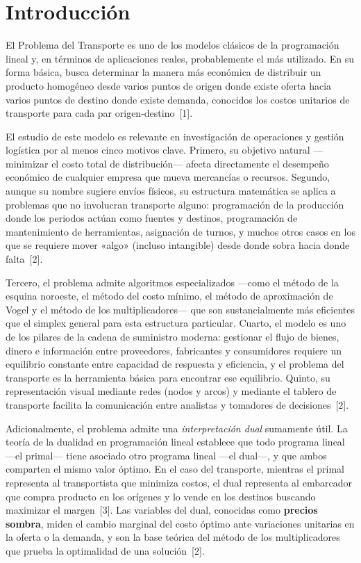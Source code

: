 \documentclass[10pt,letterpaper,twocolumn]{article}
\begin{document}
\section{Introducción}

El Problema del Transporte es uno de los modelos clásicos de la programación lineal y, en términos de aplicaciones reales, probablemente el más utilizado. En su forma básica, busca determinar la manera más económica de distribuir un producto homogéneo desde varios puntos de origen donde existe oferta hacia varios puntos de destino donde existe demanda, conocidos los costos unitarios de transporte para cada par origen-destino~[1].

El estudio de este modelo es relevante en investigación de operaciones y gestión logística por al menos cinco motivos clave. Primero, su objetivo natural ---minimizar el costo total de distribución--- afecta directamente el desempeño económico de cualquier empresa que mueva mercancías o recursos. Segundo, aunque su nombre sugiere envíos físicos, su estructura matemática se aplica a problemas que no involucran transporte alguno: programación de la producción donde los periodos actúan como fuentes y destinos, programación de mantenimiento de herramientas, asignación de turnos, y muchos otros casos en los que se requiere mover «algo» (incluso intangible) desde donde sobra hacia donde falta~[2].

Tercero, el problema admite algoritmos especializados ---como el método de la esquina noroeste, el método del costo mínimo, el método de aproximación de Vogel y el método de los multiplicadores--- que son sustancialmente más eficientes que el simplex general para esta estructura particular. Cuarto, el modelo es uno de los pilares de la cadena de suministro moderna: gestionar el flujo de bienes, dinero e información entre proveedores, fabricantes y consumidores requiere un equilibrio constante entre capacidad de respuesta y eficiencia, y el problema del transporte es la herramienta básica para encontrar ese equilibrio. Quinto, su representación visual mediante redes (nodos y arcos) y mediante el tablero de transporte facilita la comunicación entre analistas y tomadores de decisiones~[2].

Adicionalmente, el problema admite una \emph{interpretación dual} sumamente útil. La teoría de la dualidad en programación lineal establece que todo programa lineal ---el primal--- tiene asociado otro programa lineal ---el dual---, y que ambos comparten el mismo valor óptimo. En el caso del transporte, mientras el primal representa al transportista que minimiza costos, el dual representa al embarcador que compra producto en los orígenes y lo vende en los destinos buscando maximizar el margen~[3]. Las variables del dual, conocidas como \textbf{precios sombra}, miden el cambio marginal del costo óptimo ante variaciones unitarias en la oferta o la demanda, y son la base teórica del método de los multiplicadores que prueba la optimalidad de una solución~[2].
\end{document}
